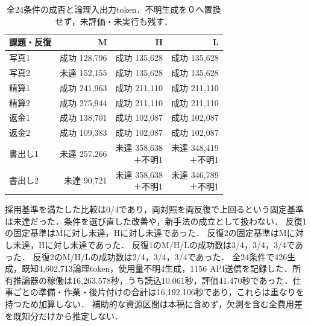 \begin{table}[tb]
\centering\fontsize{8pt}{10pt}\selectfont\setlength{\tabcolsep}{2pt}
\caption{全24条件の成否と論理入出力token．不明生成を０へ置換せず，未評価・未実行も残す．}
\begin{tabular}{lrrr}
課題・反復 & M & H & L \\ \hline
写真1 & 成功 128,796 & 成功 135,628 & 成功 135,628 \\
写真2 & 未達 152,155 & 成功 135,628 & 成功 135,628 \\
精算1 & 成功 241,963 & 成功 211,110 & 成功 211,110 \\
精算2 & 成功 275,944 & 成功 211,110 & 成功 211,110 \\
返金1 & 成功 138,701 & 成功 102,087 & 成功 102,087 \\
返金2 & 成功 109,383 & 成功 102,087 & 成功 102,087 \\
書出し1 & 未達 257,266 & \shortstack[r]{未達 358,638\\＋不明1} & \shortstack[r]{未達 348,419\\＋不明1} \\
書出し2 & 未達 90,721 & \shortstack[r]{未達 358,638\\＋不明1} & \shortstack[r]{未達 346,789\\＋不明1} \\
\hline\end{tabular}

\end{table}
採用基準を満たした比較は0/4であり，両対照を両反復で上回るという固定基準は未達だった．条件を選び直した改善や，新手法の成立として扱わない．
反復1の固定基準はMに対し未達，Hに対し未達であった．
反復2の固定基準はMに対し未達，Hに対し未達であった．
反復1のM/H/Lの成功数は3/4，3/4，3/4であった．
反復2のM/H/Lの成功数は2/4，3/4，3/4であった．
全24条件で426生成，既知4,602,713論理token，使用量不明4生成，1156 API送信を記録した．所有推論器の稼働は16,263.578秒，うち読込10.061秒，評価41.470秒であった．仕事ごとの準備・作業・後片付けの合計は16,192.106秒であり，これらは重なりを持つため加算しない．
補助的な資源区間は本稿に含めず，欠測を含む全費用差を既知分だけから推定しない．
